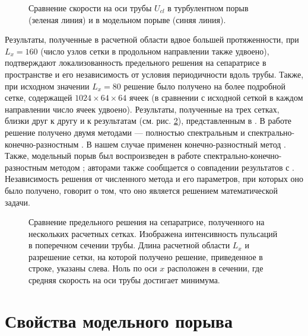 \begin{figure}[h]
\caption{Сравнение скорости на оси трубы $U_{cl}$ в турбулентном порыв (зеленая линия) и в модельном порыве (синяя линия).}
\label{ucl_cmp_img}
\end{figure}

Результаты, полученные в расчетной области вдвое большей протяженности, при $L_x = 160$ (число узлов сетки в продольном направлении также удвоено), подтверждают локализованность предельного решения на сепаратрисе в пространстве и его независимость от условия периодичности вдоль трубы. Также, при исходном значении $L_x = 80$ решение было получено на более подробной сетке, содержащей $1024 \times 64 \times 64$ ячеек (в сравнении с исходной сеткой в каждом направлении число ячеек удвоено).  Результаты, полученные на трех сетках, близки друг к другу и к результатам (см. рис. \ref{mesh_conv_pic}), представленным в \cite{Avila2013}. В работе \cite{Avila2013} решение получено двумя методами --- полностью спектральным \cite{Meseguer2007} и спектрально-конечно-разностным \cite{Willis2009}. В нашем случае применен конечно-разностный метод \cite{Nikitin2006}. Также, модельный порыв был воспроизведен в работе \cite{Chantry2014} спектрально-конечно-разностным методом \cite{Willis2009}; авторами также сообщается о совпадении результатов с \cite{Avila2013}. Независимость решения от численного метода и его параметров, при которых оно было получено, говорит о том, что оно является решением математической задачи. 

\begin{figure}[h]
\caption{Сравнение предельного решения на сепаратрисе, полученного на нескольких расчетных сетках. Изображена интенсивность пульсаций в поперечном сечении трубы. Длина расчетной области $L_x$ и разрешение сетки, на которой получено решение, приведенное в строке, указаны слева. Ноль по оси $x$ расположен в сечении, где средняя скорость на оси трубы достигает минимума. }
\label{mesh_conv_pic}
\end{figure}

\section{Свойства модельного порыва}

